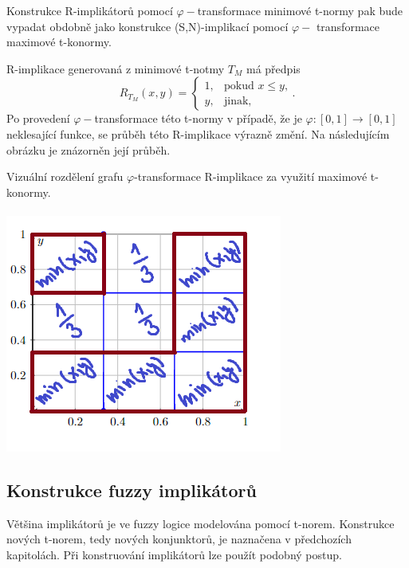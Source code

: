 Konstrukce R-implikátor\r u pomocí $\varphi-$transformace minimové t-normy pak bude vypadat obdobně jako konstrukce (S,N)-implikací pomocí $\varphi-$ transformace maximové t-konormy.
\begin{example}
    R-implikace generovaná z minimové t-notmy $T_M$ má předpis $$ R_{T_M}(x,y)=\begin{cases} 1, &\mbox {pokud $x\leq y$,} \\y, &\mbox{jinak,} \end{cases}. $$
    Po provedení $\varphi-$transformace této t-normy v případě, že je $\varphi : [0,1] \rightarrow [0,1]$ neklesající funkce, se pr\r uběh této R-implikace výrazně změní. Na následujícím obrázku je znázorněn její pr\r uběh.
    
    \begin{graph}Vizu\' aln\' i rozd\v elen\'i grafu $\varphi$-transformace R-implikace za využití maximové t-konormy.\\ \\
        \centering
        \includegraphics[scale=0.8]{template-fig/phi-Rimpli.png}
    \end{graph}

\end{example}



\subsection{Konstrukce fuzzy implikátor\r u}

Většina implikátor\r u je ve fuzzy logice modelována pomocí t-norem. Konstrukce nových t-norem, tedy nových konjunktor\r u, je naznačena v předchozích kapitolách. Při konstruování implikátor\r u lze použít podobný postup.

